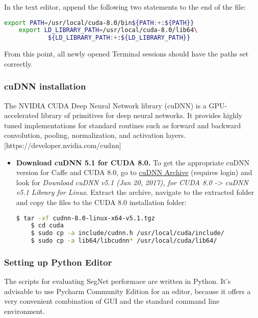 \begin{itemize}
	In the text editor, append the following two statements to the end of the file:
	
	\begin{lstlisting}[language=bash]
	export PATH=/usr/local/cuda-8.0/bin${PATH:+:${PATH}}
	export LD_LIBRARY_PATH=/usr/local/cuda-8.0/lib64\
			${LD_LIBRARY_PATH:+:${LD_LIBRARY_PATH}}
	\end{lstlisting}	
	
	From this point, all newly opened Terminal sessions should have the paths set correctly. 
	
\end{itemize}

\subsubsection{cuDNN installation}

The NVIDIA CUDA Deep Neural Network library (cuDNN) is a GPU-accelerated library of primitives for deep neural networks. It provides highly tuned implementations for standard routines such as forward and backward convolution, pooling, normalization, and activation layers. [https://developer.nvidia.com/cudnn] 

\begin{itemize}
	\item \textbf{Download cuDNN 5.1 for CUDA 8.0.} To get the appropriate cuDNN version for Caffe and CUDA 8.0, go to \href{https://developer.nvidia.com/rdp/cudnn-archive}{cuDNN Archive} (requires login) and look for \textit{Download cuDNN v5.1 (Jan 20, 2017), for CUDA 8.0 -> cuDNN v5.1 Library for Linux}. Extract the archive, navigate to the extracted folder and copy the files to the CUDA 8.0 installation folder:
	
	\begin{lstlisting}[language=bash]
	$ tar -xf cudnn-8.0-linux-x64-v5.1.tgz 
	$ cd cuda
	$ sudo cp -a include/cudnn.h /usr/local/cuda/include/
	$ sudo cp -a lib64/libcudnn* /usr/local/cuda/lib64/
	\end{lstlisting}	
\end{itemize}

\subsubsection{Setting up Python Editor}

The scripts for evaluating SegNet performace are written in Python. It's advisable to use Pycharm Community Edition for an editor, because it offers a very convenient combination of GUI and the standard command line environment.

